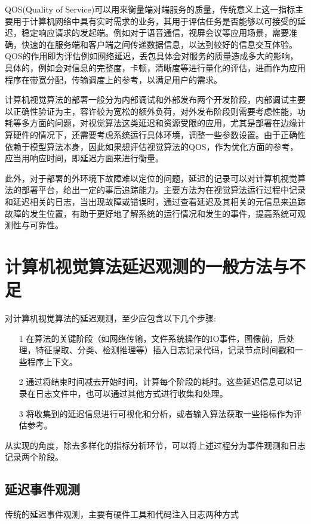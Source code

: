 \documentclass[master,anonymous]{shtthesis}
\begin{document}
QOS(Quality of Service)可以用来衡量端对端服务的质量，传统意义上这一指标主要用于计算机网络中具有实时需求的业务，其用于评估任务是否能够以可接受的延迟，稳定响应请求的发起端。例如对于语音通信，视屏会议等应用场景，需要准确，快速的在服务端和客户端之间传递数据信息，以达到较好的信息交互体验。QOS的作用即为评估例如网络延迟，丢包具体会对服务的质量造成多大的影响，具体的，例如会对信息的完整度，卡顿，清晰度等进行量化的评估，进而作为应用程序在带宽分配，传输调度上的参考，以满足用户的需求。

计算机视觉算法的部署一般分为内部调试和外部发布两个开发阶段，内部调试主要以正确性验证为主，容许较为宽松的额外负荷，对外发布阶段则需要考虑性能，功耗等多方面的问题，对视觉算法这类延迟和资源受限的应用，尤其是部署在边缘计算硬件的情况下，还需要考虑系统运行具体环境，调整一些参数设置。由于正确性依赖于模型算法本身，因此如果想评估视觉算法的QOS，作为优化方面的参考，应当用响应时间，即延迟方面来进行衡量。

此外，对于部署的外环境下故障难以定位的问题，延迟的记录可以对计算机视觉算法的部署平台，给出一定的事后追踪能力。主要方法为在视觉算法运行过程中记录和延迟相关的日志，当出现故障或错误时，通过查看延迟及其相关的元信息来追踪故障的发生位置，有助于更好地了解系统的运行情况和发生的事件，提高系统可观测性与可靠性。

\section{计算机视觉算法延迟观测的一般方法与不足}\label{现有计算机视觉算法延迟观测的一般方法与不足}
对计算机视觉算法的延迟观测，至少应包含以下几个步骤:
\begin{itemize}
	\item[1]在算法的关键阶段（如网络传输，文件系统操作的IO事件，图像前，后处理，特征提取、分类、检测推理等）插入日志记录代码，记录节点时间戳和一些程序上下文。
	\item[2]通过将结束时间减去开始时间，计算每个阶段的耗时。这些延迟信息可以记录在日志文件中，也可以通过其他方式进行收集和处理。
	\item[3] 将收集到的延迟信息进行可视化和分析，或者输入算法获取一些指标作为评估参考。
\end{itemize}

从实现的角度，除去多样化的指标分析环节，可以将上述过程分为事件观测和日志记录两个阶段。

\subsection{延迟事件观测}\label{延迟事件观测}
传统的延迟事件观测，主要有硬件工具和代码注入日志两种方式
\end{document}
